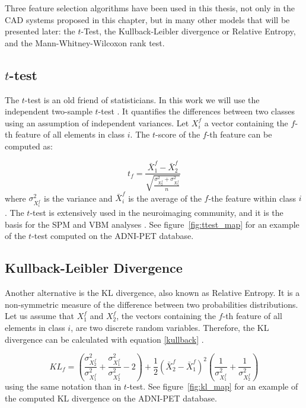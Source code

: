 Three feature selection algorithms have been used in this thesis, not only in the \ac{CAD} systems proposed in this chapter, but in many other models that will be presented later: the $t$-Test, the Kullback-Leibler divergence or Relative Entropy, and the Mann-Whitney-Wilcoxon rank test. 

\subsection{$t$-test}
The $t$-test is an old friend of statisticians. In this work we will use the independent two-sample $t$-test \cite{Fay10}. It quantifies the differences between two classes using an assumption of independent variances. Let $X_i^f$ a vector containing the $f$-th feature of all elements in class $i$. The $t$-score of the $f$-th feature can be computed as:

\begin{equation}
t_f = \frac{\bar{X}_1^f - \bar{X}_2^f}{\sqrt{\frac{\sigma_{X_2^f}^2+\sigma_{X_1^f}^2}{n}}}
\end{equation}
where $\sigma_{X_i^f}^2$ is the variance and $\bar{X}_i^f$ is the average of the $f$-the feature within class $i$. The $t$-test is extensively used in the neuroimaging community, and it is the basis for the \ac{SPM} and \ac{VBM} analyses \cite{spm_book}. See figure~\ref{fig:ttest_map} for an example of the $t$-test computed on the ADNI-PET database.

\subsection{Kullback-Leibler Divergence} 
Another alternative is the \acf{KL} divergence, also known as Relative Entropy. It is a non-symmetric measure of the difference between two probabilities distributions. Let us assume that $X_1^f$ and $X_2^f$, the vectors containing the $f$-th feature of all elements in class $i$, are two discrete random variables. Therefore, the \ac{KL} divergence can be calculated with equation \ref{kullback} \cite{Theodoridis1999}.

\begin{equation}\label{kullback}
KL_f = \left(\frac{\sigma_{X_2^f}^2}{\sigma_{X_1^f}^2} +\frac{\sigma_{X_1^f}^2}{\sigma_{X_2^f}^2} -2 \right) + \frac{1}{2}\left(\bar{X}_2^f-\bar{X}_1^f\right)^2\left(\frac{1}{\sigma_{X_1^f}^2} + \frac{1}{\sigma_{X_2^f}^2}\right)
\end{equation}
using the same notation than in $t$-test. See figure~\ref{fig:kl_map} for an example of the computed \ac{KL} divergence on the ADNI-PET database.

